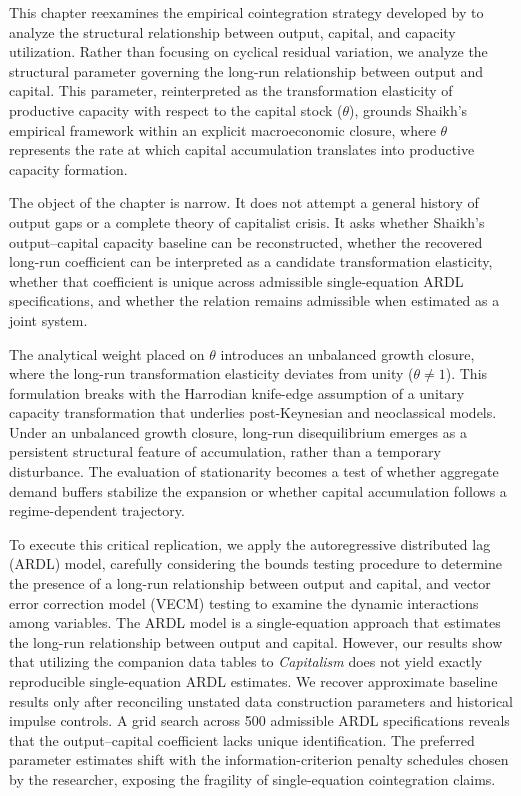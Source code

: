 \documentclass[11pt]{article}
\begin{document}
This chapter reexamines the empirical cointegration strategy developed by \citet{Shaikh2016} to analyze the structural relationship between output, capital, and capacity utilization. Rather than focusing on cyclical residual variation, we analyze the structural parameter governing the long-run relationship between output and capital. This parameter, reinterpreted as the transformation elasticity of productive capacity with respect to the capital stock ($\theta$), grounds Shaikh's empirical framework within an explicit macroeconomic closure, where $\theta$ represents the rate at which capital accumulation translates into productive capacity formation.

The object of the chapter is narrow. It does not attempt a general history of output gaps or a complete theory of capitalist crisis. It asks whether Shaikh's output--capital capacity baseline can be reconstructed, whether the recovered long-run coefficient can be interpreted as a candidate transformation elasticity, whether that coefficient is unique across admissible single-equation ARDL specifications, and whether the relation remains admissible when estimated as a joint system.

The analytical weight placed on $\theta$ introduces an unbalanced growth closure, where the long-run transformation elasticity deviates from unity ($\theta \neq 1$). This formulation breaks with the Harrodian knife-edge assumption of a unitary capacity transformation that underlies post-Keynesian and neoclassical models. Under an unbalanced growth closure, long-run disequilibrium emerges as a persistent structural feature of accumulation, rather than a temporary disturbance. The evaluation of stationarity becomes a test of whether aggregate demand buffers stabilize the expansion or whether capital accumulation follows a regime-dependent trajectory.

To execute this critical replication, we apply the autoregressive distributed lag (ARDL) model, carefully considering the bounds testing procedure to determine the presence of a long-run relationship between output and capital, and vector error correction model (VECM) testing to examine the dynamic interactions among variables. The ARDL model is a single-equation approach that estimates the long-run relationship between output and capital. However, our results show that utilizing the companion data tables to \textit{Capitalism} does not yield exactly reproducible single-equation ARDL estimates. We recover approximate baseline results only after reconciling unstated data construction parameters and historical impulse controls. A grid search across 500 admissible ARDL specifications reveals that the output--capital coefficient lacks unique identification. The preferred parameter estimates shift with the information-criterion penalty schedules chosen by the researcher, exposing the fragility of single-equation cointegration claims.
\end{document}
